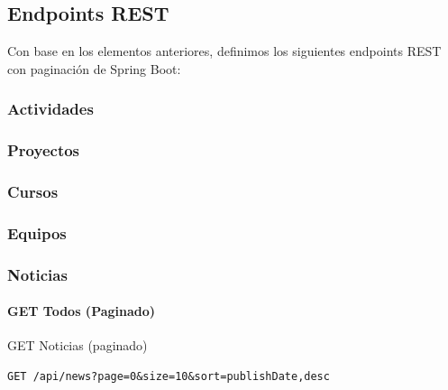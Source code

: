 \documentclass[11pt,a4paper]{article}
\begin{document}
\subsection{Endpoints REST}
Con base en los elementos anteriores, definimos los siguientes endpoints REST con paginación de Spring Boot:


\subsubsection{Actividades}


\subsubsection{Proyectos}


\subsubsection{Cursos}


\subsubsection{Equipos}

\subsubsection{Noticias}

\paragraph{GET Todos (Paginado)}

\begin{center}
	\begin{minipage}{\textwidth}
		\begin{codebox}{GET Noticias (paginado)}
			\begin{lstlisting}[language=HTTP]
GET /api/news?page=0&size=10&sort=publishDate,desc
\end{lstlisting}
		\end{codebox}
	\end{minipage}
\end{center}
\end{document}
